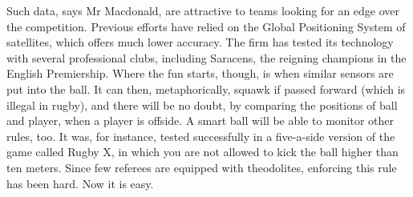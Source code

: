 Such data, says Mr Macdonald, are attractive to teams looking for an edge over
the competition. Previous efforts have relied on the Global Positioning System
of satellites, which offers much lower accuracy. The firm has tested its
technology with several professional clubs\cite{chen2017computation,
al-shuwaili2017energyefficient}, including Saracens, the reigning champions in
the English Premiership\cite{ding2019beef}. Where the fun starts, though, is
when similar sensors are put into the ball. It can then, metaphorically, squawk
if passed forward (which is illegal in rugby), and there will be no doubt, by
comparing the positions of ball and player, when a player is offside. A smart
ball will be able to monitor other rules, too. It was, for instance, tested
successfully in a five-a-side version of the game called Rugby X, in which you
are not allowed to kick the ball higher than ten meters. Since few referees are
equipped with theodolites, enforcing this rule has been hard\cite{fan2017cost,
chantre2018multiobjective, santoyo-gonzalez2018edge,wang2018edge ,
zhao2018optimala, jia2017optimal, meng2017cloudlet ,xu2016efficient, %
chen2017computation}. Now it is easy.